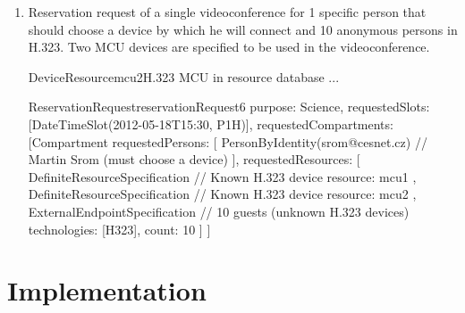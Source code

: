 \begin{enumerate}
\begin{EntityExample}{DeviceResource}{terminal3}{Another H.323 terminal in resource database}
...
\end{EntityExample}

\begin{EntityExample}{ReservationRequest}{reservationRequest5}{}
purpose: Science,
requestedSlots: [DateTimeSlot(2012-05-18T15:30, P1H)],
requestedCompartments: [Compartment {
  requestedResources: [
    VirtualRoomSpecification {
      device: mcu1,
      size: 4
    },
    DefiniteResourceSpecification { // Known H.323 device
      resource: terminal2
    },
    DefiniteResourceSpecification { // Known H.323 device
      resource: terminal3
    }
  ]
}]
\end{EntityExample}

\item Reservation request of a single videoconference for 1 specific person that should choose a device by which he will connect and 10 anonymous persons in H.323. Two MCU devices are specified to be used in the videoconference.


\begin{EntityExample}{DeviceResource}{mcu2}{H.323 MCU in resource database}
...
\end{EntityExample}

\begin{EntityExample}{ReservationRequest}{reservationRequest6}{}
purpose: Science,
requestedSlots: [DateTimeSlot(2012-05-18T15:30, P1H)],
requestedCompartments: [Compartment {
  requestedPersons: [
    PersonByIdentity(srom@cesnet.cz) // Martin Srom (must choose a device)
  ],
  requestedResources: [
    DefiniteResourceSpecification { // Known H.323 device
      resource: mcu1
    },
    DefiniteResourceSpecification { // Known H.323 device
      resource: mcu2
    },
    ExternalEndpointSpecification { // 10 guests (unknown H.323 devices)
      technologies: [H323],
      count: 10
    }
  ]
}]
\end{EntityExample}

\end{enumerate}


\section{Implementation}

